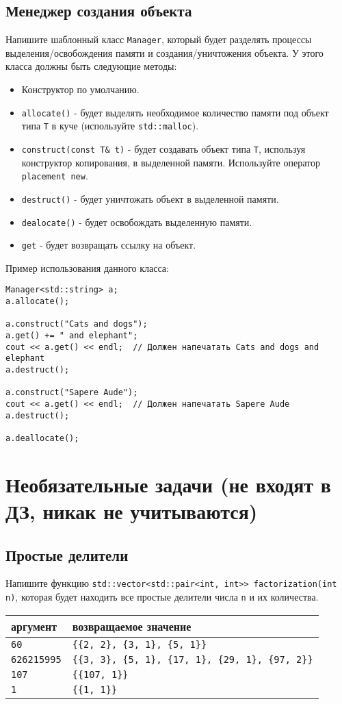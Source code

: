 \documentclass{article}
\begin{document}
\newpage
\subsection{Менеджер создания объекта}
Напишите шаблонный класс \texttt{Manager}, который будет разделять процессы выделения/освобождения памяти и создания/уничтожения объекта. У этого класса должны быть следующие методы:
\begin{itemize}
\item Конструктор по умолчанию.
\item \texttt{allocate()} - будет выделять необходимое количество памяти под объект типа \texttt{T} в куче (используйте \texttt{std::malloc}).
\item \texttt{construct(const T\& t)} - будет создавать объект типа \texttt{T}, используя конструктор копирования, в выделенной памяти. Используйте оператор \texttt{placement new}.
\item \texttt{destruct()} - будет уничтожать объект в выделенной памяти.
\item \texttt{dealocate()} - будет освобождать выделенную памяти.
\item \texttt{get} - будет возвращать ссылку на объект.
\end{itemize}
Пример использования данного класса:
\begin{lstlisting}
Manager<std::string> a;
a.allocate();

a.construct("Cats and dogs");
a.get() += " and elephant";
cout << a.get() << endl;  // Должен напечатать Cats and dogs and elephant
a.destruct();

a.construct("Sapere Aude");
cout << a.get() << endl;  // Должен напечатать Sapere Aude
a.destruct();

a.deallocate();
\end{lstlisting}


\newpage



\newpage
\section*{Необязательные задачи (не входят в ДЗ, никак не учитываются)}
\setcounter{subsection}{0}

\subsection{Простые делители}
Напишите функцию \texttt{std::vector<std::pair<int, int>{}> factorization(int n)}, которая будет находить все простые делители числа \texttt{n} и их количества.
\begin{center}
\begin{tabular}{ l | l }
 аргумент & возвращаемое значение \\ \hline
 \texttt{60} & \texttt{\{\{2, 2\}, \{3, 1\}, \{5, 1\}\}} \\
 \texttt{626215995} & \texttt{\{\{3, 3\}, \{5, 1\}, \{17, 1\}, \{29, 1\}, \{97, 2\}\}} \\
 \texttt{107} & \texttt{\{\{107, 1\}\}} \\
 \texttt{1} & \texttt{\{\{1, 1\}\}} 
\end{tabular}
\end{center}
\end{document}
